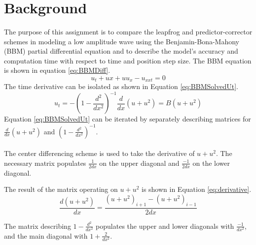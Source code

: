 \documentclass[a4paper,12pt]{article}
\begin{document}
\section{Background} 
	\paragraph*{}
		The purpose of this assignment is to compare the leapfrog and predictor-corrector schemes in modeling a low amplitude wave using the Benjamin-Bona-Mahony (BBM) partial differential equation and to describe the model's accuracy and computation time with respect to time and position step size.  The BBM equation is shown in equation \ref{eq:BBMDiff}.
			\begin{equation}
				\label{eq:BBMDiff}
				u_{t} + u{x} + uu_{x} - u_{xxt} = 0
			\end{equation}
		The time derivative can be isolated as shown in Equation \ref{eq:BBMSolvedUt}.
			\begin{equation}
				\label{eq:BBMSolvedUt}
				u_{t}=-(1-\frac{d^{2}}{dx^{2}})^{-1}\frac{d}{dx}(u+u^{2}) = B(u+u^{2})
			\end{equation}
		Equation \ref{eq:BBMSolvedUt} can be iterated by separately describing matrices for $\frac{d}{dx}(u+u^2)$ and $(1-\frac{d^{2}}{dx^{2}})^{-1}$.  
		\paragraph*{} The center differencing scheme is used to take the derivative of $u+u^{2}$.  The necessary matrix populates $\frac{1}{2dx}$ on the upper diagonal and $\frac{-1}{2dx}$ on the lower diagonal.  

			  The result of the matrix operating on $u+u^{2}$ is shown in Equation \ref{eq:derivative}.
			\begin{equation}
				\label{eq:derivative}
				\frac{d(u+u^{2})}{dx} = \frac{(u+u^{2})_{i+1} - (u+u^{2})_{i-1}}{2dx}
			\end{equation}

		The matrix describing $1-\frac{d^{2}}{dx^{2}}$ populates the upper and lower diagonals with $\frac{-1}{dx^{2}}$, and the main diagonal with $1 + \frac{2}{dx^{2}}$.
\end{document}
